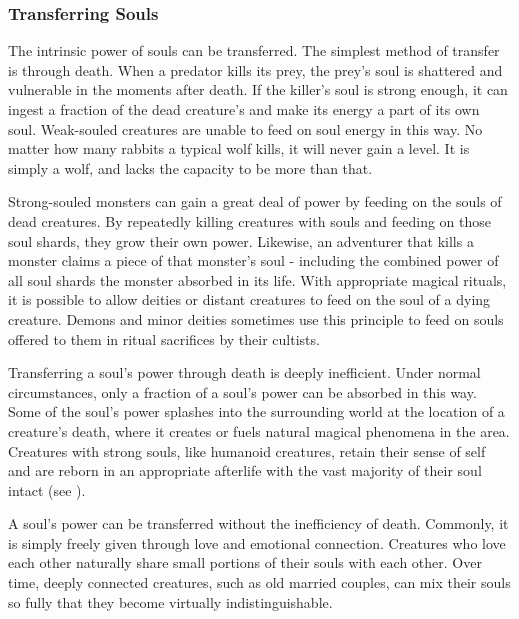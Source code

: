         \subsubsection{Transferring Souls}
            The intrinsic power of souls can be transferred.
            The simplest method of transfer is through death.
            When a predator kills its prey, the prey's soul is shattered and vulnerable in the moments after death.
            If the killer's soul is strong enough, it can ingest a fraction of the dead creature's and make its energy a part of its own soul.
            Weak-souled creatures are unable to feed on soul energy in this way.
            No matter how many rabbits a typical wolf kills, it will never gain a level.
            It is simply a wolf, and lacks the capacity to be more than that.

            Strong-souled monsters can gain a great deal of power by feeding on the souls of dead creatures.
            By repeatedly killing creatures with souls and feeding on those soul shards, they grow their own power.
            Likewise, an adventurer that kills a monster claims a piece of that monster's soul - including the combined power of all soul shards the monster absorbed in its life.
            With appropriate magical rituals, it is possible to allow deities or distant creatures to feed on the soul of a dying creature.
            Demons and minor deities sometimes use this principle to feed on souls offered to them in ritual sacrifices by their cultists.

            Transferring a soul's power through death is deeply inefficient.
            Under normal circumstances, only a fraction of a soul's power can be absorbed in this way.
            Some of the soul's power splashes into the surrounding world at the location of a creature's death, where it creates or fuels natural magical phenomena in the area.
            Creatures with strong souls, like humanoid creatures, retain their sense of self and are reborn in an appropriate afterlife with the vast majority of their soul intact (see ).

            A soul's power can be transferred without the inefficiency of death.
            Commonly, it is simply freely given through love and emotional connection.
            Creatures who love each other naturally share small portions of their souls with each other.
            Over time, deeply connected creatures, such as old married couples, can mix their souls so fully that they become virtually indistinguishable.

